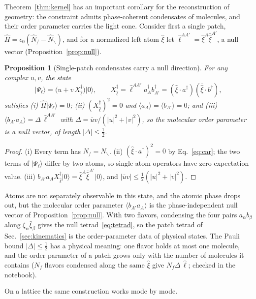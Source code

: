 \documentclass[reprint,aps,prd,amsmath,amssymb,superscriptaddress,nofootinbib,floatfix]{revtex4-2}
\theoremstyle{plain}
\newtheorem{proposition}{Proposition}
\theoremstyle{definition}
\theoremstyle{remark}
\newcommand{\Lat}{\ensuremath{/}}                 %
\newcommand{\Rat}{\ensuremath{\backslash}}        %
\newcommand{\Mol}{\ensuremath{X}}                 %
\newcommand{\ket}[1]{\ensuremath{|#1\rangle}}
\newcommand{\Hc}{\hat{H}}
\begin{document}
Theorem~\ref{thm:kernel} has an important corollary for the reconstruction of geometry: the constraint admits
phase-coherent condensates of molecules, and their order parameter carries the light cone. Consider first a single
patch, $\Hc=\epsilon_0(\hat N_\Lat-\hat N_\Rat)$, and for a normalized left atom $\hat\xi$ let $\hat\ell^{AA'}=\hat\xi^A\bar{\hat\xi}^{A'}$, a null
vector (Proposition~\ref{prop:null}).

\begin{proposition}[Single-patch condensates carry a null direction]
\label{prop:coherent}
For any complex $u,v$, the state
\begin{equation}
\ket{\Psi_\ell}=\big(u+v\,\Mol^\dagger_{\hat\ell}\big)\ket0,
\qquad \Mol^\dagger_{\hat\ell}=\hat\ell^{AA'}a^\dagger_Ab^\dagger_{A'}=(\hat\xi\cdot a^\dagger)(\bar{\hat\xi}\cdot b^\dagger) ,
\label{eq:coherent}
\end{equation}
satisfies (i) $\Hc\ket{\Psi_\ell}=0$; (ii) $(\Mol^\dagger_{\hat\ell})^2=0$ and $\langle a_A\rangle=\langle b_{A'}\rangle=0$; and
(iii) $\langle b_{A'}a_A\rangle=\Delta\,\hat\ell^{AA'}$ with $\Delta=\bar uv/(|u|^2+|v|^2)$, so the molecular order parameter is a null vector,
of length $|\Delta|\le\tfrac12$.
\end{proposition}
\begin{proof}
(i) Every term has $N_\Lat=N_\Rat$. (ii) $(\hat\xi\cdot a^\dagger)^2=0$ by Eq.~\eqref{eq:car}; the two terms of $\ket{\Psi_\ell}$ differ by
two atoms, so single-atom operators have zero expectation value. (iii) $b_{A'}a_A\Mol^\dagger_{\hat\ell}\ket0=\hat\xi^A\bar{\hat\xi}^{A'}\ket0$,
and $|\bar uv|\le\tfrac12(|u|^2+|v|^2)$.
\end{proof}

Atoms are not separately observable in this state, and the atomic phase drops out, but the molecular order
parameter $\langle b_{A'}a_A\rangle$ is the phase-independent null vector of Proposition~\ref{prop:null}. With two flavors,
condensing the four pairs $a_\alpha b_\beta$ along $\xi_\alpha\bar\xi_\beta$ gives the null tetrad~\eqref{eq:tetrad}, so the patch tetrad of
Sec.~\ref{sec:kinematics} is the order-parameter data of physical states. The Pauli bound $|\Delta|\le\tfrac12$ has a physical
meaning: one flavor holds at most one molecule, and the order parameter of a patch grows only with the number of
molecules it contains ($N_f$ flavors condensed along the same $\hat\xi$ give $N_f\Delta\,\hat\ell$; checked in the notebook).

On a lattice the same construction works mode by mode.
\end{document}
